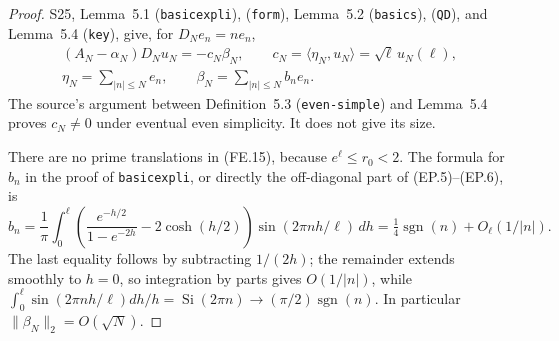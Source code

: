 \begin{proof}
S25, Lemma~5.1 (\texttt{basicexpli}), (\texttt{form}),
Lemma~5.2 (\texttt{basics}), (\texttt{QD}), and
Lemma~5.4 (\texttt{key}), give, for \(D_Ne_n=ne_n\),
\[
 \begin{gathered}
 (A_N-\alpha_N)D_Nu_N=-c_N\beta_N,\qquad
 c_N=\langle\eta_N,u_N\rangle=\sqrt\ell\,u_N(\ell),\\
 \eta_N=\sum_{|n|\leq N}e_n,\qquad
 \beta_N=\sum_{|n|\leq N}b_ne_n.
 \end{gathered}                                          \tag{FE.20}
\]
The source's argument between Definition~5.3
(\texttt{even-simple}) and Lemma~5.4 proves \(c_N\ne0\)
under eventual even simplicity.  It does not give its size.

There are no prime translations in (FE.15), because
\(e^\ell\leq r_0<2\).  The formula for \(b_n\) in the proof
of \texttt{basicexpli}, or directly the off-diagonal part of
(EP.5)--(EP.6), is
\[
 b_n=\frac1\pi\int_0^\ell
       \left(\frac{e^{-h/2}}{1-e^{-2h}}-2\cosh(h/2)\right)
                         \sin(2\pi nh/\ell)\,dh
       =\tfrac14\operatorname{sgn}(n)+O_\ell(1/|n|).
                                                        \tag{FE.21}
\]
The last equality follows by subtracting \(1/(2h)\);
the remainder extends smoothly to \(h=0\), so integration by
parts gives \(O(1/|n|)\), while
\(\int_0^\ell\sin(2\pi nh/\ell)dh/h
 =\operatorname{Si}(2\pi n)\to(\pi/2)\operatorname{sgn}(n)\).
In particular \(\|\beta_N\|_2=O(\sqrt N)\).


\end{proof}

